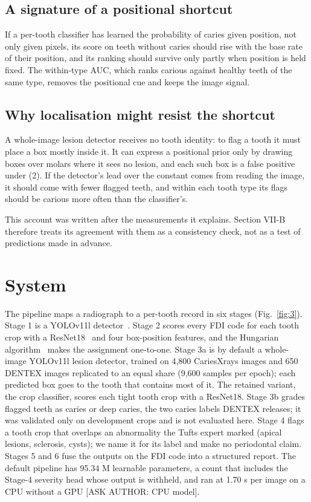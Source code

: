 \documentclass[conference]{IEEEtran}
\begin{document}
\subsection{A signature of a positional shortcut}

If a per-tooth classifier has learned the probability of caries given position, not only given pixels, its score on teeth without caries should rise with the base rate of their position, and its ranking should survive only partly when position is held fixed. The within-type AUC, which ranks carious against healthy teeth of the same type, removes the positional cue and keeps the image signal.

\subsection{Why localisation might resist the shortcut}

A whole-image lesion detector receives no tooth identity: to flag a tooth it must place a box mostly inside it. It can express a positional prior only by drawing boxes over molars where it sees no lesion, and each such box is a false positive under (2). If the detector's lead over the constant comes from reading the image, it should come with fewer flagged teeth, and within each tooth type its flags should be carious more often than the classifier's.

This account was written after the measurements it explains. Section VII-B therefore treats its agreement with them as a consistency check, not as a test of predictions made in advance.

\section{System}

The pipeline maps a radiograph to a per-tooth record in six stages (Fig.~\ref{fig:3}). Stage 1 is a YOLOv11l detector~\cite{jocher2024yolo11}. Stage 2 scores every FDI code for each tooth crop with a ResNet18~\cite{he2016resnet} and four box-position features, and the Hungarian algorithm~\cite{kuhn1955hungarian} makes the assignment one-to-one. Stage 3a is by default a whole-image YOLOv11l lesion detector, trained on 4,800 CariesXrays images and 650 DENTEX images replicated to an equal share (9,600 samples per epoch); each predicted box goes to the tooth that contains most of it. The retained variant, the crop classifier, scores each tight tooth crop with a ResNet18. Stage 3b grades flagged teeth as caries or deep caries, the two caries labels DENTEX releases; it was validated only on development crops and is not evaluated here. Stage 4 flags a tooth crop that overlaps an abnormality the Tufts expert marked (apical lesions, sclerosis, cysts); we name it for its label and make no periodontal claim. Stages 5 and 6 fuse the outputs on the FDI code into a structured report. The default pipeline has 95.34 M learnable parameters, a count that includes the Stage-4 severity head whose output is withheld, and ran at 1.70 s per image on a CPU without a GPU [ASK AUTHOR: CPU model].
\end{document}
